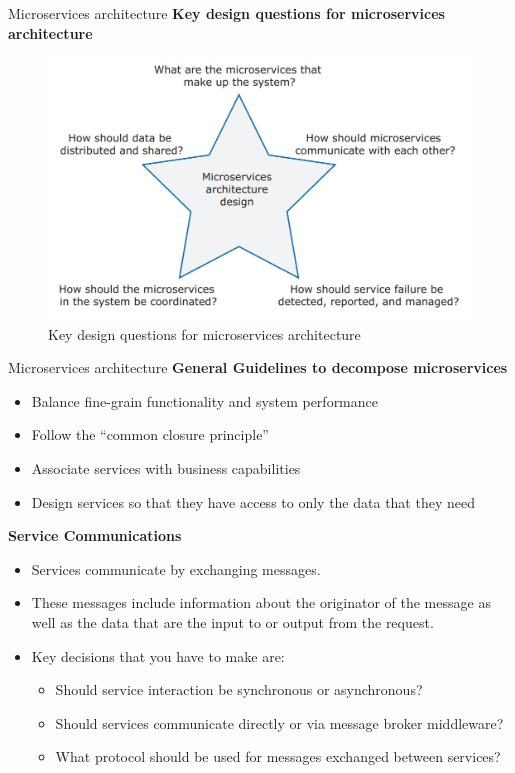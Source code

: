 \documentclass{beamer}
\begin{document}
\begin{frame}{Microservices architecture}
	\textbf{Key design questions for microservices architecture}
		\begin{figure}
		\includegraphics[scale=.3]{img/m5_13}
		\caption{Key design questions for microservices architecture}
	\end{figure}
\end{frame}
\begin{frame}{Microservices architecture}
	\textbf{General Guidelines to decompose microservices}
\begin{itemize}
	\item Balance fine-grain functionality and system performance
	\item Follow the “common closure principle”
	\item Associate services with business capabilities
	\item Design services so that they have access to only the data that they need
\end{itemize}
\textbf{Service Communications}
\begin{itemize}
	\item Services communicate by exchanging messages.
	\item These messages include information about the originator 
	of the message as well as the data that are the input to or output from the request.
	\item Key decisions that you have to make are:
	\begin{itemize}
		\item Should service interaction be synchronous or asynchronous?
		\item Should services communicate directly or via message broker middleware?
		\item What protocol should be used for messages exchanged between services?
	\end{itemize}
\end{itemize}
\end{frame}
\end{document}
